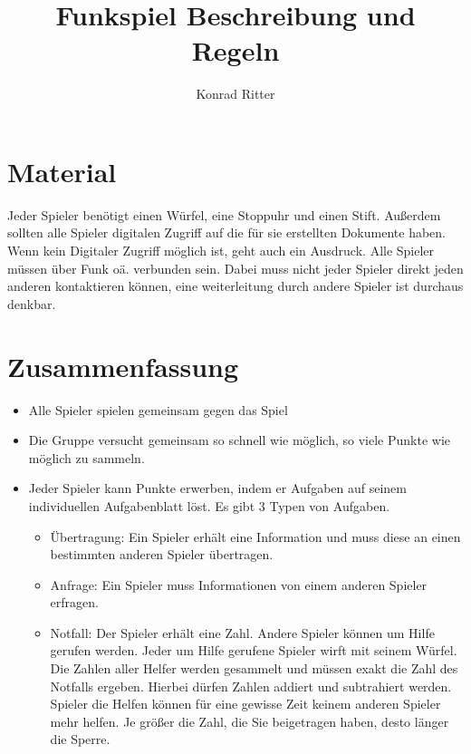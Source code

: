 \documentclass[12pt,a4paper]{scrreport}
\author{Konrad Ritter}
\title{Funkspiel Beschreibung und Regeln}
\begin{document}
\maketitle
\section{Material}
Jeder Spieler benötigt einen Würfel, eine Stoppuhr und einen Stift.
Außerdem sollten alle Spieler digitalen Zugriff auf die für sie erstellten
Dokumente haben. Wenn kein Digitaler Zugriff möglich ist, geht auch ein
Ausdruck. Alle Spieler müssen über Funk oä. verbunden sein. Dabei muss nicht
jeder Spieler direkt jeden anderen kontaktieren können, eine weiterleitung durch
andere Spieler ist durchaus denkbar.

\section{Zusammenfassung}
\begin{itemize}
	\item Alle Spieler spielen gemeinsam gegen das Spiel
	\item Die Gruppe versucht gemeinsam so schnell wie möglich, so viele Punkte
		wie möglich zu sammeln.
	\item Jeder Spieler kann Punkte erwerben, indem er Aufgaben auf seinem
		individuellen Aufgabenblatt löst. Es gibt 3 Typen von Aufgaben.
		\begin{itemize}
			\item Übertragung: Ein Spieler erhält eine Information und muss
				diese an einen bestimmten anderen Spieler übertragen.
			\item Anfrage: Ein Spieler muss Informationen von einem anderen
				Spieler erfragen. 
			\item Notfall: Der Spieler erhält eine Zahl. Andere Spieler können
				um Hilfe gerufen werden. Jeder um Hilfe gerufene Spieler wirft
				mit seinem Würfel. Die Zahlen aller Helfer werden gesammelt und
				müssen exakt die Zahl des Notfalls ergeben. Hierbei dürfen
				Zahlen addiert und subtrahiert werden. Spieler die Helfen können
				für eine gewisse Zeit keinem anderen Spieler mehr helfen. Je
				größer die Zahl, die Sie beigetragen haben, desto länger die
				Sperre.
		\end{itemize}
\end{itemize}
\end{document}
